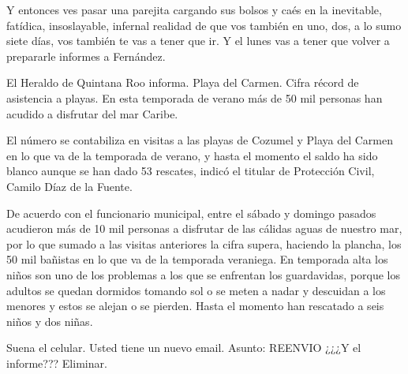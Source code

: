 \documentclass[12pt,twoside,openright,a5paper]{book}
\begin{document}
\vspace{0.5cm}
\hrulefill\hspace{0.2cm} \decofourleft\decofourright \hspace{0.2cm} \hrulefill
\vspace{0.5cm}

Y entonces ves pasar una parejita cargando sus bolsos y caés en la
inevitable, fatídica, insoslayable, infernal realidad de que vos también en
uno, dos, a lo sumo siete días, vos también te vas a tener que ir. Y
el lunes vas a tener que volver a prepararle informes a Fernández.


\vspace{0.5cm}
\hrulefill\hspace{0.2cm} \decofourleft\decofourright \hspace{0.2cm} \hrulefill
\vspace{0.5cm}

El Heraldo de Quintana Roo informa. Playa del Carmen. Cifra récord de
asistencia a playas. En esta temporada de verano más de 50 mil personas
han acudido a disfrutar del mar Caribe.

El número se contabiliza en visitas a las playas de Cozumel y Playa
del Carmen en lo que va de la temporada de verano, y hasta el momento el
saldo ha sido blanco aunque se han dado 53 rescates, indicó el titular de
Protección Civil, Camilo Díaz de la Fuente.

De acuerdo con el funcionario municipal, entre el sábado y domingo pasados
acudieron más de 10 mil personas a disfrutar de las cálidas aguas de
nuestro mar, por lo que sumado a las visitas anteriores la cifra supera,
haciendo la plancha, los 50 mil bañistas en lo que va de la temporada
veraniega. En temporada alta los niños
son uno de los problemas a los que se enfrentan los guardavidas, porque
los adultos se quedan dormidos tomando sol o se meten a nadar y descuidan a
los menores y estos se alejan o se pierden. Hasta el momento han rescatado
a seis niños y dos niñas.


\vspace{0.5cm}
\hrulefill\hspace{0.2cm} \decofourleft\decofourright \hspace{0.2cm} \hrulefill
\vspace{0.5cm}

Suena el celular. Usted tiene un nuevo email. Asunto: REENVIO ¿¿¿Y el informe??? Eliminar.
\end{document}
